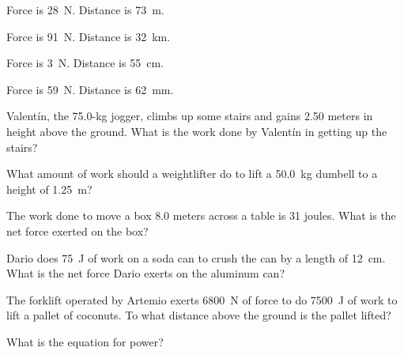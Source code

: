 \documentclass[main.tex]{subfiles}
\begin{document}
\begin{exercise} \label{mroTSQ}
    Force is \SI{28}{N}. Distance is \SI{73}{m}.
\end{exercise}

\begin{exercise} \label{1KDZL2}
    Force is \SI{91}{N}. Distance is \SI{32}{km}.
\end{exercise}

\begin{exercise} \label{masH3z}
    Force is \SI{3}{N}. Distance is \SI{55}{cm}.
\end{exercise}

\begin{exercise} \label{KU49Fc}
    Force is \SI{59}{N}. Distance is \SI{62}{mm}.
\end{exercise}

\cyanhrule

\begin{exercise} \label{VMEVDL}
    Valent\'{i}n, the 75.0-kg jogger, climbs up some stairs and gains 2.50 meters in height above the ground. What is the work done by Valent\'{i}n in getting up the stairs? 
\end{exercise}

\begin{exercise} \label{OgbvKL}
    What amount of work should a weightlifter do to lift a \SI{50.0}{kg} dumbell to a height of \SI{1.25}{m}?
\end{exercise}

\begin{exercise} \label{T8C3X0}
    The work done to move a box 8.0 meters across a table is 31 joules. What is the net force exerted on the box?
\end{exercise}

\begin{exercise} \label{7BKGsL}
    Dario does \SI{75}{J} of work on a soda can to crush the can by a length of \SI{12}{cm}. What is the net force Dario exerts on the aluminum can?
\end{exercise}

\begin{exercise} \label{sRogOc}
    The forklift operated by Artemio exerts \SI{6800}{N} of force to do \SI{7500}{J} of work to lift a pallet of coconuts. To what distance above the ground is the pallet lifted? 
\end{exercise}


\begin{exercise} \label{AlYFHO}
    What is the equation for power?
\end{exercise}
\end{document}
